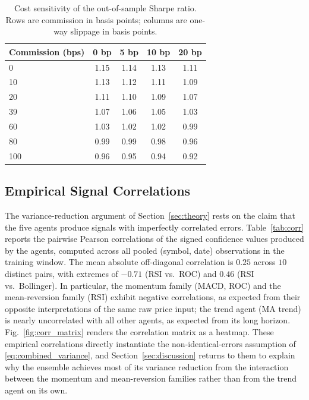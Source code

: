 \documentclass{ieeeaccess}
\newcommand{\CorrMeanAbs}{\ensuremath{0.25}}
\newcommand{\CorrMin}{\ensuremath{-0.71}}
\newcommand{\CorrMax}{\ensuremath{0.46}}
\newcommand{\CorrN}{\ensuremath{10}}
\begin{document}
\begin{table}[t]
\centering
\caption{Cost sensitivity of the out-of-sample Sharpe ratio. Rows are commission in basis points; columns are one-way slippage in basis points.}
\label{tab:cost_sensitivity}
\begin{tabular}{lcccc}
\toprule
Commission (bps) & 0 bp & 5 bp & 10 bp & 20 bp \\
\midrule
0 & 1.15 & 1.14 & 1.13 & 1.11 \\
10 & 1.13 & 1.12 & 1.11 & 1.09 \\
20 & 1.11 & 1.10 & 1.09 & 1.07 \\
39 & 1.07 & 1.06 & 1.05 & 1.03 \\
60 & 1.03 & 1.02 & 1.02 & 0.99 \\
80 & 0.99 & 0.99 & 0.98 & 0.96 \\
100 & 0.96 & 0.95 & 0.94 & 0.92 \\
\bottomrule
\end{tabular}
\end{table}

\subsection{Empirical Signal Correlations}
\label{subsec:correlations}

The variance-reduction argument of Section~\ref{sec:theory} rests on the claim that the five agents produce signals with imperfectly correlated errors. Table~\ref{tab:corr} reports the pairwise Pearson correlations \cite{pearson1896} of the signed confidence values produced by the agents, computed across all pooled (symbol, date) observations in the training window. The mean absolute off-diagonal correlation is \CorrMeanAbs{} across \CorrN{} distinct pairs, with extremes of \CorrMin{} (RSI vs.\ ROC) and \CorrMax{} (RSI vs.\ Bollinger). In particular, the momentum family (MACD, ROC) and the mean-reversion family (RSI) exhibit negative correlations, as expected from their opposite interpretations of the same raw price input; the trend agent (MA trend) is nearly uncorrelated with all other agents, as expected from its long horizon. Fig.~\ref{fig:corr_matrix} renders the correlation matrix as a heatmap. These empirical correlations directly instantiate the non-identical-errors assumption of \eqref{eq:combined_variance}, and Section~\ref{sec:discussion} returns to them to explain why the ensemble achieves most of its variance reduction from the interaction between the momentum and mean-reversion families rather than from the trend agent on its own.
\end{document}
